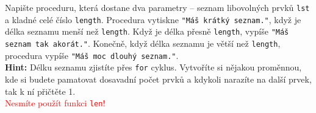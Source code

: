 \question[70]
Napište proceduru, která dostane dva parametry -- seznam libovolných prvků
\texttt{lst} a kladné celé číslo \texttt{length}. Procedura vytiskne
\texttt{"Máš krátký seznam."}, když je délka seznamu menší než \texttt{length}.
Když je délka přesně \texttt{length}, vypíše \texttt{"Máš seznam tak akorát."}.
Konečně, když délka seznamu je větší než \texttt{length}, procedura vypíše
\texttt{"Máš moc dlouhý seznam."}.\\
\textbf{Hint:} Délku seznamu zjistíte přes \texttt{for} cyklus. Vytvoříte si
nějakou proměnnou, kde si budete pamatovat dosavadní počet prvků a kdykoli
narazíte na další prvek, tak k ní přičtěte 1.\\
\textcolor{red}{Nesmíte použít funkci \texttt{len}!}

